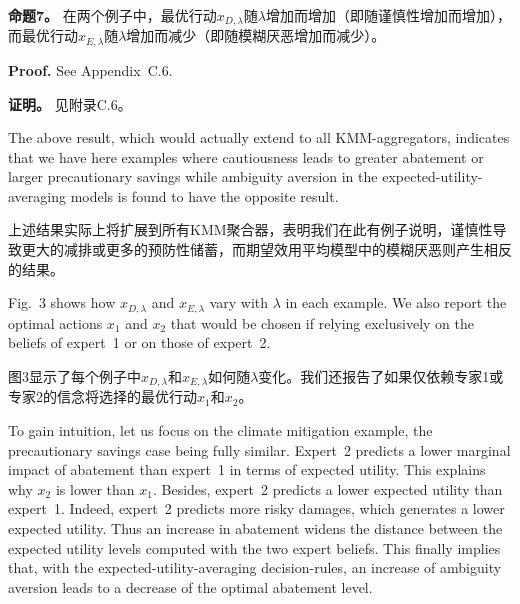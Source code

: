 \documentclass[12pt,a4paper]{article}
\newenvironment{original}
  {\par\noindent\ignorespaces}
  {\par}
\newenvironment{translation}
  {\par\noindent{\color{transblue}\ignorespaces}}
  {\par\medskip}
\begin{document}
\begin{translation}
\textbf{命题7。} 在两个例子中，最优行动$x_{D,\lambda}$随$\lambda$增加而增加（即随谨慎性增加而增加），而最优行动$x_{E,\lambda}$随$\lambda$增加而减少（即随模糊厌恶增加而减少）。
\end{translation}

\begin{original}
\textbf{Proof.} See Appendix~C.6.
\end{original}

\begin{translation}
\textbf{证明。} 见附录C.6。
\end{translation}

\begin{original}
The above result, which would actually extend to all KMM-aggregators, indicates that we have here examples where cautiousness leads to greater abatement or larger precautionary savings while ambiguity aversion in the expected-utility-averaging models is found to have the opposite result.
\end{original}

\begin{translation}
上述结果实际上将扩展到所有KMM聚合器，表明我们在此有例子说明，谨慎性导致更大的减排或更多的预防性储蓄，而期望效用平均模型中的模糊厌恶则产生相反的结果。
\end{translation}

\begin{original}
Fig.\ 3 shows how $x_{D,\lambda}$ and $x_{E,\lambda}$ vary with $\lambda$ in each example. We also report the optimal actions $x_{1}$ and $x_{2}$ that would be chosen if relying exclusively on the beliefs of expert~1 or on those of expert~2.
\end{original}

\begin{translation}
图3显示了每个例子中$x_{D,\lambda}$和$x_{E,\lambda}$如何随$\lambda$变化。我们还报告了如果仅依赖专家1或专家2的信念将选择的最优行动$x_{1}$和$x_{2}$。
\end{translation}

\begin{original}
To gain intuition, let us focus on the climate mitigation example, the precautionary savings case being fully similar. Expert~2 predicts a lower marginal impact of abatement than expert~1 in terms of expected utility. This explains why $x_{2}$ is lower than $x_{1}$. Besides, expert~2 predicts a lower expected utility than expert~1. Indeed, expert~2 predicts more risky damages, which generates a lower expected utility. Thus an increase in abatement widens the distance between the expected utility levels computed with the two expert beliefs. This finally implies that, with the expected-utility-averaging decision-rules, an increase of ambiguity aversion leads to a decrease of the optimal abatement level.
\end{original}
\end{document}
